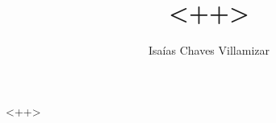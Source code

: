 \documentclass[a4paper,12pt]{article}
\author{Isa\'{i}as Chaves Villamizar}
\title{<++>}
\theoremstyle{plain}
\theoremstyle{definition}
\begin{document}
\maketitle
<++>
%
%
\end{document}

